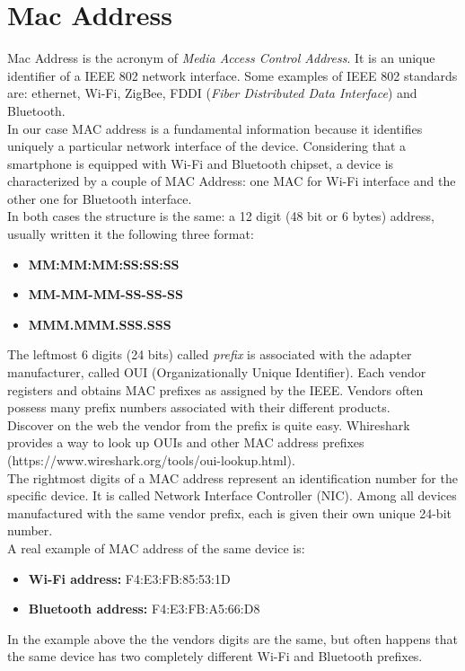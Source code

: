 \section{Mac Address}
Mac Address is the acronym of \textit{Media Access Control Address}. It is an unique identifier of a IEEE 802 network interface. Some examples of IEEE 802 standards are: ethernet, Wi-Fi, ZigBee, FDDI (\textit{Fiber Distributed Data Interface}) and Bluetooth. \\
In our case MAC address is a fundamental information because it identifies uniquely a particular network interface of the device. Considering that a smartphone is equipped with Wi-Fi and Bluetooth chipset, a device is characterized by a couple of MAC Address: one MAC for Wi-Fi interface and the other one for Bluetooth interface.\\
\linebreak
In both cases the structure is the same: a 12 digit (48 bit or 6 bytes) address, usually written it the following three format: 
\begin{itemize}
\item \textbf{MM:MM:MM:SS:SS:SS}
\item \textbf{MM-MM-MM-SS-SS-SS}
\item \textbf{MMM.MMM.SSS.SSS}
\end{itemize}
The leftmost 6 digits (24 bits) called \textit{prefix} is associated with the adapter manufacturer, called OUI (Organizationally Unique Identifier). Each vendor registers and obtains MAC prefixes as assigned by the IEEE. Vendors often possess many prefix numbers associated with their different products.\\
Discover on the web the vendor from the prefix is quite easy. Whireshark  provides a way to look up OUIs and other MAC address prefixes (https://www.wireshark.org/tools/oui-lookup.html).\\ 
\linebreak
The rightmost digits of a MAC address represent an identification number for the specific device. It is called Network Interface Controller (NIC). Among all devices manufactured with the same vendor prefix, each is given their own unique 24-bit number.\\
\linebreak
A real example of MAC address of the same device is:
\begin{itemize}
\item \textbf{Wi-Fi address:} F4:E3:FB:85:53:1D
\item \textbf{Bluetooth address:} F4:E3:FB:A5:66:D8
\end{itemize}
In the example above the the vendors digits are the same, but often happens that the same device has two completely different Wi-Fi and Bluetooth prefixes.


